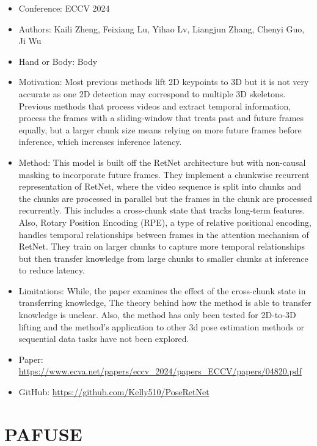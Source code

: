\documentclass{article}
\begin{document}
\begin{itemize}
    \item Conference: ECCV 2024
    \item Authors: Kaili Zheng, Feixiang Lu, Yihao Lv, Liangjun Zhang, Chenyi Guo, Ji Wu
    \item Hand or Body: Body
    \item Motivation: Most previous methods lift 2D keypoints to 3D but it is not very accurate as one 2D detection may correspond to multiple 3D skeletons. Previous methods that process videos and extract temporal information, process the frames with a sliding-window that treats past and future frames equally, but a larger chunk size means relying on more future frames before inference, which increases inference latency.
    \item Method: This model is built off the RetNet architecture but with non-causal masking to incorporate future frames. They implement a chunkwise recurrent representation of RetNet, where the video sequence is split into chunks and the chunks are processed in parallel but the frames in the chunk are processed recurrently. This includes a cross-chunk state that tracks long-term features. Also, Rotary Position Encoding (RPE), a type of relative positional encoding, handles temporal relationships between frames in the attention mechanism of RetNet. They train on larger chunks to capture more temporal relationships but then transfer knowledge from large chunks to smaller chunks at inference to reduce latency.
    \item Limitations: While, the paper examines the effect of the cross-chunk state in transferring knowledge, The theory behind how the method is able to transfer knowledge is unclear. Also, the method has only been tested for 2D-to-3D lifting and the method's application to other 3d pose estimation methods or sequential data tasks have not been explored.
    \item Paper: \url{https://www.ecva.net/papers/eccv_2024/papers_ECCV/papers/04820.pdf}
    \item GitHub: \url{https://github.com/Kelly510/PoseRetNet}
\end{itemize}

\section*{PAFUSE}
\end{document}
